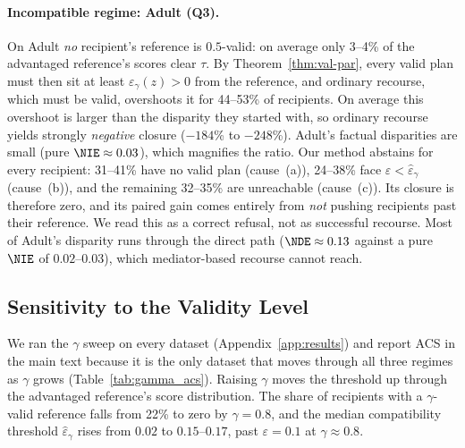 \paragraph{Incompatible regime: Adult (Q3).}
On Adult \emph{no} recipient's reference is $0.5$-valid: on average only
3--4\% of the advantaged reference's scores clear $\tau$. By
Theorem~\ref{thm:val-par}, every valid plan must then sit at least
$\varepsilon_\gamma(z)>0$ from the reference, and ordinary recourse, which
must be valid, overshoots it for 44--53\% of recipients. On average this
overshoot is larger than the disparity they started with, so ordinary
recourse yields strongly \emph{negative} closure ($-184$\% to $-248$\%). Adult's
factual disparities are small (pure $\NIE\approx0.03$), which magnifies the
ratio. Our method abstains for every recipient: 31--41\% have no valid plan
(cause~(a)), 24--38\% face $\varepsilon<\hat\varepsilon_\gamma$ (cause~(b)),
and the remaining 32--35\% are unreachable (cause~(c)). Its closure is
therefore zero, and its paired gain comes entirely from \emph{not} pushing
recipients past their reference. We read this as a correct refusal, not as
successful recourse. Most of Adult's disparity runs through the direct path
($\NDE\approx0.13$ against a pure $\NIE$ of $0.02$--$0.03$), which
mediator-based recourse cannot reach.

\subsection{Sensitivity to the Validity Level}
\label{sec:exp_gamma}

We ran the $\gamma$ sweep on every dataset (Appendix~\ref{app:results}) and
report ACS in the main text because it is the only dataset that moves through
all three regimes as $\gamma$ grows (Table~\ref{tab:gamma_acs}). Raising
$\gamma$ moves the threshold up through the advantaged reference's score
distribution. The share of recipients with a $\gamma$-valid reference falls
from 22\% to zero by $\gamma=0.8$, and the median compatibility threshold
$\hat\varepsilon_\gamma$ rises from $0.02$ to $0.15$--$0.17$, past
$\varepsilon=0.1$ at $\gamma\approx0.8$.

